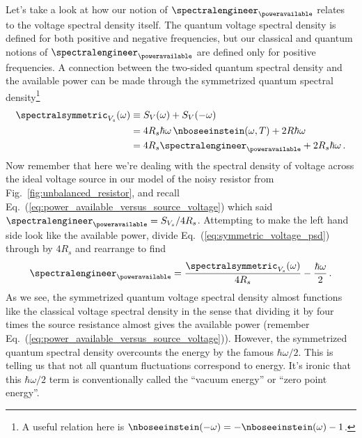 
Let's take a look at how our notion of $\spectralengineer_{\poweravailable}$ relates to the voltage spectral density itself.
The quantum voltage spectral density is defined for both positive and negative frequencies, but our classical and quantum notions of $\spectralengineer_{\poweravailable}$ are defined only for positive frequencies.
A connection between the two-sided quantum spectral density and the available power can be made through the symmetrized quantum spectral density\footnote{A useful relation here is $\nboseeinstein(-\omega) = -\nboseeinstein(\omega) - 1$.}
\begin{align}
    \spectralsymmetric_{V_s}(\omega)
    & \equiv S_V(\omega) + S_V(-\omega) \nonumber \\
    &= 4 R_s \hbar \omega \, \nboseeinstein(\omega, T) + 2 R \hbar \omega \nonumber \\
    &= 4 R_s \spectralengineer_{\poweravailable} + 2 R_s \hbar \omega \label{eq:symmetric_voltage_psd}
    \, .
\end{align}
Now remember that here we're dealing with the spectral density of voltage across the ideal voltage source in our model of the noisy resistor from Fig.~\ref{fig:unbalanced_resistor}, and recall Eq.~(\ref{eq:power_available_versus_source_voltage}) which said $\spectralengineer_{\poweravailable} = S_{V_s} / 4 R_s$.
Attempting to make the left hand side look like the available power, divide Eq.~(\ref{eq:symmetric_voltage_psd}) through by $4 R_s$ and rearrange to find
\begin{equation}
  \spectralengineer_{\poweravailable} = \frac{\spectralsymmetric_{V_s}(\omega)}{4 R_s} - \frac{\hbar \omega}{2}
  \, .
\end{equation}
As we see, the symmetrized quantum voltage spectral density almost functions like the classical voltage spectral density in the sense that dividing it by four times the source resistance almost gives the available power (remember Eq.~(\ref{eq:power_available_versus_source_voltage})).
However, the symmetrized quantum spectral density overcounts the energy by the famous $\hbar \omega / 2$.
This is telling us that not all quantum fluctuations correspond to energy.
It's ironic that this $\hbar \omega / 2$ term is conventionally called the ``vacuum energy'' or ``zero point energy''.


